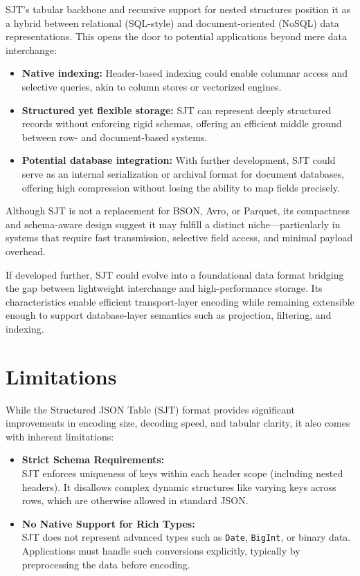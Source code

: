 \documentclass[12pt]{article}
\begin{document}
SJT's tabular backbone and recursive support for nested structures position it as a hybrid between relational (SQL-style) and document-oriented (NoSQL) data representations. This opens the door to potential applications beyond mere data interchange:

\begin{itemize}
  \item \textbf{Native indexing:} Header-based indexing could enable columnar access and selective queries, akin to column stores or vectorized engines.
  \item \textbf{Structured yet flexible storage:} SJT can represent deeply structured records without enforcing rigid schemas, offering an efficient middle ground between row- and document-based systems.
  \item \textbf{Potential database integration:} With further development, SJT could serve as an internal serialization or archival format for document databases, offering high compression without losing the ability to map fields precisely.
\end{itemize}

Although SJT is not a replacement for BSON, Avro, or Parquet, its compactness and schema-aware design suggest it may fulfill a distinct niche—particularly in systems that require fast transmission, selective field access, and minimal payload overhead.

If developed further, SJT could evolve into a foundational data format bridging the gap between lightweight interchange and high-performance storage. Its characteristics enable efficient transport-layer encoding while remaining extensible enough to support database-layer semantics such as projection, filtering, and indexing.
\section{Limitations}

While the Structured JSON Table (SJT) format provides significant improvements in encoding size, decoding speed, and tabular clarity, it also comes with inherent limitations:

\begin{itemize}
  \item \textbf{Strict Schema Requirements:} \\
  SJT enforces uniqueness of keys within each header scope (including nested headers). It disallows complex dynamic structures like varying keys across rows, which are otherwise allowed in standard JSON.

  \item \textbf{No Native Support for Rich Types:} \\
  SJT does not represent advanced types such as \texttt{Date}, \texttt{BigInt}, or binary data. Applications must handle such conversions explicitly, typically by preprocessing the data before encoding.
\end{itemize}
\end{document}
